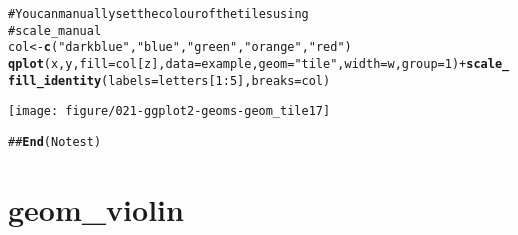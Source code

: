 \documentclass[a4paper,titlepage]{tufte-handout}\usepackage{graphicx, color}
\makeatletter
\def\maxwidth{ %
  \ifdim\Gin@nat@width>\linewidth
    \linewidth
  \else
    \Gin@nat@width
  \fi
}
\newcommand{\hlfunctioncall}[1]{\textcolor[rgb]{0.501960784313725,0,0.329411764705882}{\textbf{#1}}}%
\newcommand{\hlstring}[1]{\textcolor[rgb]{0.6,0.6,1}{#1}}%
\newcommand{\hlcomment}[1]{\textcolor[rgb]{0.180392156862745,0.6,0.341176470588235}{#1}}%
\newenvironment{kframe}{%
 \def\at@end@of@kframe{}%
 \ifinner\ifhmode%
  \def\at@end@of@kframe{\end{minipage}}%
  \begin{minipage}{\columnwidth}%
 \fi\fi%
 \def\FrameCommand##1{\hskip\@totalleftmargin \hskip-\fboxsep
 \colorbox{shadecolor}{##1}\hskip-\fboxsep
     \hskip-\linewidth \hskip-\@totalleftmargin \hskip\columnwidth}%
 \MakeFramed {\advance\hsize-\width
   \@totalleftmargin\z@ \linewidth\hsize
   \@setminipage}}%
 {\par\unskip\endMakeFramed%
 \at@end@of@kframe}
\newenvironment{knitrout}{}{} %
\makeatother
\begin{document}
\begin{knitrout}
\begin{kframe}
\begin{alltt}
\hlcomment{# You can manually set the colour of the tiles using}
\hlcomment{# scale_manual}
col <- \hlfunctioncall{c}(\hlstring{"darkblue"}, \hlstring{"blue"}, \hlstring{"green"}, \hlstring{"orange"}, \hlstring{"red"})
\hlfunctioncall{qplot}(x, y, fill=col[z], data=example, geom=\hlstring{"tile"}, width=w, group=1) + \hlfunctioncall{scale_fill_identity}(labels=letters[1:5], breaks=col)
\end{alltt}
\end{kframe}\texttt{[image: figure/021-ggplot2-geoms-geom\_tile17]} \begin{kframe}\begin{alltt}
\hlcomment{## \hlfunctioncall{End}(No test)}
\end{alltt}
\end{kframe}
\end{knitrout}


\section{geom\_violin}
\end{document}
